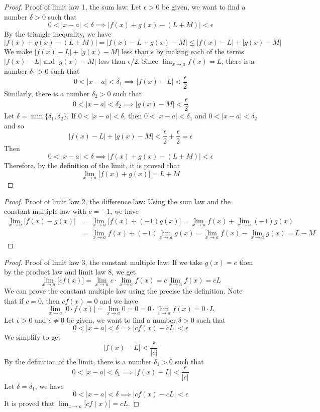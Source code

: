 \begin{proof}
    Proof of limit law 1, the sum law:
    Let \(\epsilon>0\) be given, we want to find a number \(\delta>0\) such
    that
    \[0<|x-a|<\delta\implies|f(x)+g(x)-(L+M)|<\epsilon\]
    By the triangle inequality, we have
    \[|f(x)+g(x)-(L+M)|=|f(x)-L+g(x)-M|\leq|f(x)-L|+|g(x)-M|\]
    We make \(|f(x)-L|+|g(x)-M|\) less than \(\epsilon\) by making each of the
    terms \(|f(x)-L|\) and \(|g(x)-M|\) less than \(\epsilon/2\).
    Since \(\displaystyle{\lim_{x\to a}f(x)=L}\),
    there is a number \(\delta_1>0\) such that
    \[0<|x-a|<\delta_1\implies|f(x)-L|<\frac{\epsilon}{2}\]
    Similarly, there is a number \(\delta_2>0\) such that
    \[0<|x-a|<\delta_2\implies|g(x)-M|<\frac{\epsilon}{2}\]
    Let \(\delta=\min\{\delta_1,\delta_2\}\).
    If \(0<|x-a|<\delta\), then \(0<|x-a|<\delta_1\) and \(0<|x-a|<\delta_2\)
    and so
    \[|f(x)-L|+|g(x)-M|<\frac{\epsilon}{2}+\frac{\epsilon}{2}=\epsilon\]
    Then
    \[0<|x-a|<\delta\implies|f(x)+g(x)-(L+M)|<\epsilon\]
    Therefore, by the definition of the limit, it is proved that
    \[\lim_{x\to a}\bigl[f(x)+g(x)\bigr]=L+M\]
\end{proof}
\begin{proof}
    Proof of limit law 2, the difference law:
    Using the sum law and the constant multiple law with \(c=-1\), we have
    \begin{align*}
        \lim_{x\to a}\bigl[f(x)-g(x)\bigr]
        &= \lim_{x\to a}\bigl[f(x)+(-1)g(x)\bigr]
        =\lim_{x\to a}f(x)+\lim_{x\to a}(-1)g(x) \\
        &=\lim_{x\to a}f(x)+(-1)\lim_{x\to a}g(x)
        =\lim_{x\to a}f(x)-\lim_{x\to a}g(x)=L-M
    \end{align*}
\end{proof}
\begin{proof}
    Proof of limit law 3, the constant multiple law:
    If we take \(g(x)=c\) then by the product law and limit law 8, we get
    \[\lim_{x\to a}\bigl[cf(x)\bigr]=\lim_{x\to a}c\cdot\lim_{x\to a}f(x)
    =c\lim_{x\to a}f(x)=cL\]
    We can prove the constant multiple law using the precise the definition.
    Note that if \(c=0\), then \(cf(x)=0\) and we have
    \[\lim_{x\to a}\bigl[0\cdot f(x)\bigr]=\lim_{x\to a}0=0
    =0\cdot\lim_{x\to a}f(x)=0\cdot L\]
    Let \(\epsilon>0\) and \(c\neq0\) be given, we want to find a number
    \(\delta>0\) such that
    \[0<|x-a|<\delta\implies|cf(x)-cL|<\epsilon\]
    We simplify to get
    \[|f(x)-L|<\frac{\epsilon}{|c|}\]
    By the definition of the limit, there is a number \(\delta_1>0\) such that
    \[0<|x-a|<\delta_1\implies|f(x)-L|<\frac{\epsilon}{|c|}\]
    Let \(\delta=\delta_1\), we have
    \[0<|x-a|<\delta\implies|cf(x)-cL|<\epsilon\]
    It is proved that \(\displaystyle{\lim_{x\to a}\bigl[cf(x)\bigr]=cL}\).
\end{proof}
